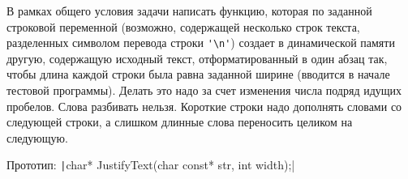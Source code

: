 \begin{zztask}
В рамках общего условия задачи написать функцию, которая по заданной строковой
переменной (возможно, содержащей несколько строк текста, разделенных символом
перевода строки \verb|'\n'|) создает в динамической памяти другую, содержащую
исходный текст, отформатированный в один абзац так, чтобы длина каждой
строки была равна заданной ширине (вводится в начале тестовой программы).
Делать это надо за счет изменения числа подряд идущих пробелов. Слова
разбивать нельзя. Короткие строки надо дополнять словами со следующей
строки, а слишком длинные слова переносить целиком на следующую.

Прототип: \texttt|char* JustifyText(char const* str, int width);|
\end{zztask}

